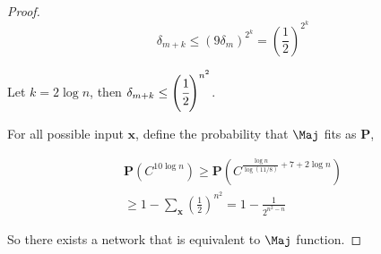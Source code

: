 \begin{proof}
$$\delta_{m+k} \le (9\delta_{m})^{2^k} = \left(\frac{1}{2}\right)^{2^k}$$

Let $k = 2 \log n$, then $\delta_{m+k} \le \left(\cfrac{1}{2}\right)^{n^2}$.

For all possible input $\mathbf{x}$, define the probability that $\Maj$ fits as $\mathbf{P}$, 

\begin{gather*}
    \mathbf{P}(C^{10\log n}) \ge \mathbf{P}(C^{\frac{\log n}{\log (11/8)}+ 7 + 2\log n})  \\ 
    \ge 1-\sum_{\mathbf{x}} \left(\frac{1}{2}\right)^{n^2} = 1-\frac{1}{2^{n^2-n}}
\end{gather*}


So there exists a network that is equivalent to $\Maj$ function.
\end{proof}
